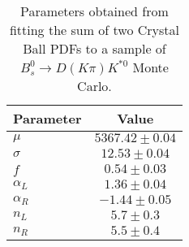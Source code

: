\begin{table}[h]
  \centering
  \begin{tabular}{lc}
      \toprule
      Parameter & Value \\
      \midrule
      $\mu$ & $5367.42 \pm 0.04$ \\
      $\sigma$ & $12.53 \pm 0.04$ \\
      $f$ & $0.54 \pm 0.03$ \\
      $\alpha_L$ & $1.36 \pm 0.04$ \\
      $\alpha_R$ & $-1.44 \pm 0.05$ \\
      $n_L$ & $5.7 \pm 0.3$ \\
      $n_R$ & $5.5 \pm 0.4$ \\
  \bottomrule
  \end{tabular}
  \caption{Parameters obtained from fitting the sum of two Crystal Ball PDFs to a sample of $B^0_s \to D(K\pi)K^{*0}$ Monte Carlo.}
\label{tab:signal_Bs_MC_params}
\end{table}
